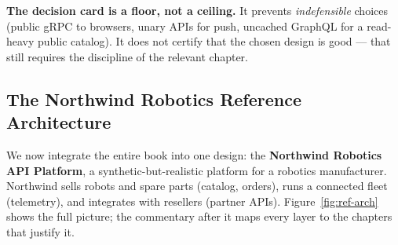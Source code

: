 \begin{warningbox}
\textbf{The decision card is a floor, not a ceiling.} It prevents
\emph{indefensible} choices (public gRPC to browsers, unary APIs for push,
uncached GraphQL for a read-heavy public catalog). It does not certify that
the chosen design is good --- that still requires the discipline of the
relevant chapter.
\end{warningbox}

\subsection{The Northwind Robotics Reference Architecture}
\label{sec:ref-arch}

We now integrate the entire book into one design: the \textbf{Northwind
Robotics API Platform}, a synthetic-but-realistic platform for a robotics
manufacturer. Northwind sells robots and spare parts (catalog, orders), runs
a connected fleet (telemetry), and integrates with resellers (partner APIs).
Figure~\ref{fig:ref-arch} shows the full picture; the commentary after it
maps every layer to the chapters that justify it.

